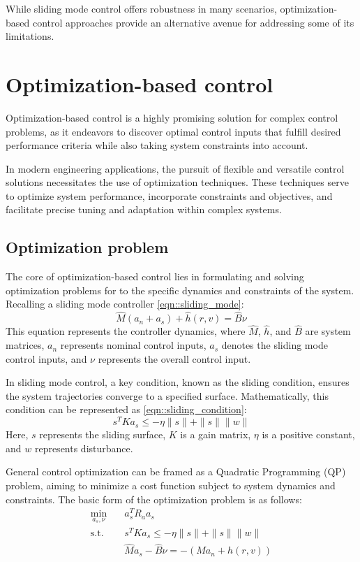    While sliding mode control offers robustness in many scenarios, 
    optimization-based control approaches provide an alternative avenue 
    for addressing some of its limitations.

\section{Optimization-based control}

Optimization-based control is a highly promising solution 
for complex control problems, as it endeavors to discover 
optimal control inputs that fulfill desired performance 
criteria while also taking system constraints into account. 

In modern engineering applications, the pursuit of flexible and versatile 
control solutions necessitates the use of optimization techniques. These 
techniques serve to optimize system performance, incorporate constraints 
and objectives, and facilitate precise tuning and adaptation within complex systems.

\subsection{Optimization problem}

The core of optimization-based control lies in formulating and solving optimization 
problems for to the specific dynamics and constraints of the system. 
Recalling a sliding mode controller \ref{eqn::sliding_mode}:
\begin{equation*}
    \hat M(a_n + a_s)  + \hat h (r, v) = \hat B \nu
\end{equation*}
This equation represents the controller dynamics, where $\hat{M}$, $\hat{h}$, 
and $\hat{B}$ are system matrices, $a_n$ represents nominal control inputs, 
$a_s$ denotes the sliding mode control inputs, and $\nu$ represents the overall control input.

In sliding mode control, a key condition, known as the sliding condition, 
ensures the system trajectories converge to a specified surface. 
Mathematically, this condition can be represented as \ref{eqn::sliding_condition}:
\begin{equation*}
    s^TKa_s \leq -\eta \|s\| + \|s\|\|w\|
\end{equation*}
Here, $s$ represents the sliding surface, $K$ is a gain matrix, $\eta$ is a 
positive constant, and $w$ represents disturbance.

General control optimization can be framed as a Quadratic Programming (QP) 
problem, aiming to minimize a cost function subject to system dynamics 
and constraints. The basic form of the optimization problem is as follows:
\begin{equation}
\begin{aligned}
\min_{a_s, \nu} \quad & a_s^T R_a a_s \\
\textrm{s.t.} \quad & s^TKa_s \leq -\eta \|s\| + \|s\|\|w\| \\
&\hat Ma_s - \hat B\nu = -(Ma_n + h(r, v))
\end{aligned}
\end{equation}

